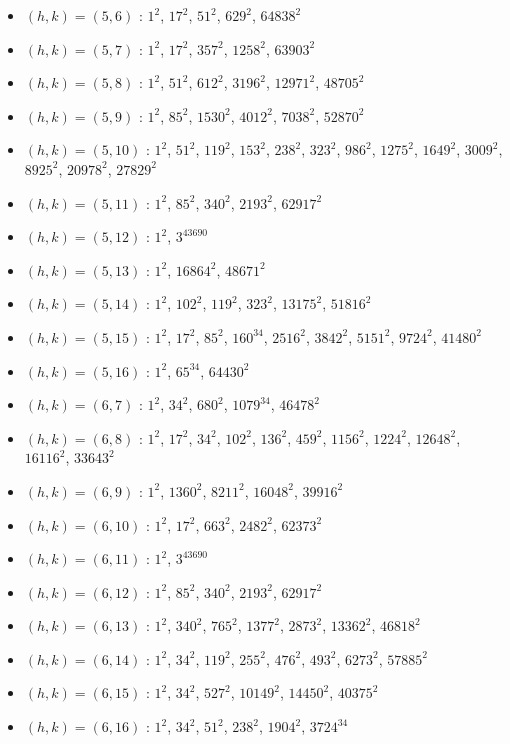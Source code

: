 \begin{itemize}
\item $(h,k)=(5,6)$ : $1^{2}$, $17^{2}$, $51^{2}$, $629^{2}$, $64838^{2}$
\item $(h,k)=(5,7)$ : $1^{2}$, $17^{2}$, $357^{2}$, $1258^{2}$, $63903^{2}$
\item $(h,k)=(5,8)$ : $1^{2}$, $51^{2}$, $612^{2}$, $3196^{2}$, $12971^{2}$, $48705^{2}$
\item $(h,k)=(5,9)$ : $1^{2}$, $85^{2}$, $1530^{2}$, $4012^{2}$, $7038^{2}$, $52870^{2}$
\item $(h,k)=(5,10)$ : $1^{2}$, $51^{2}$, $119^{2}$, $153^{2}$, $238^{2}$, $323^{2}$, $986^{2}$, $1275^{2}$, $1649^{2}$, $3009^{2}$, $8925^{2}$, $20978^{2}$, $27829^{2}$
\item $(h,k)=(5,11)$ : $1^{2}$, $85^{2}$, $340^{2}$, $2193^{2}$, $62917^{2}$
\item $(h,k)=(5,12)$ : $1^{2}$, $3^{43690}$
\item $(h,k)=(5,13)$ : $1^{2}$, $16864^{2}$, $48671^{2}$
\item $(h,k)=(5,14)$ : $1^{2}$, $102^{2}$, $119^{2}$, $323^{2}$, $13175^{2}$, $51816^{2}$
\item $(h,k)=(5,15)$ : $1^{2}$, $17^{2}$, $85^{2}$, $160^{34}$, $2516^{2}$, $3842^{2}$, $5151^{2}$, $9724^{2}$, $41480^{2}$
\item $(h,k)=(5,16)$ : $1^{2}$, $65^{34}$, $64430^{2}$
\item $(h,k)=(6,7)$ : $1^{2}$, $34^{2}$, $680^{2}$, $1079^{34}$, $46478^{2}$
\item $(h,k)=(6,8)$ : $1^{2}$, $17^{2}$, $34^{2}$, $102^{2}$, $136^{2}$, $459^{2}$, $1156^{2}$, $1224^{2}$, $12648^{2}$, $16116^{2}$, $33643^{2}$
\item $(h,k)=(6,9)$ : $1^{2}$, $1360^{2}$, $8211^{2}$, $16048^{2}$, $39916^{2}$
\item $(h,k)=(6,10)$ : $1^{2}$, $17^{2}$, $663^{2}$, $2482^{2}$, $62373^{2}$
\item $(h,k)=(6,11)$ : $1^{2}$, $3^{43690}$
\item $(h,k)=(6,12)$ : $1^{2}$, $85^{2}$, $340^{2}$, $2193^{2}$, $62917^{2}$
\item $(h,k)=(6,13)$ : $1^{2}$, $340^{2}$, $765^{2}$, $1377^{2}$, $2873^{2}$, $13362^{2}$, $46818^{2}$
\item $(h,k)=(6,14)$ : $1^{2}$, $34^{2}$, $119^{2}$, $255^{2}$, $476^{2}$, $493^{2}$, $6273^{2}$, $57885^{2}$
\item $(h,k)=(6,15)$ : $1^{2}$, $34^{2}$, $527^{2}$, $10149^{2}$, $14450^{2}$, $40375^{2}$
\item $(h,k)=(6,16)$ : $1^{2}$, $34^{2}$, $51^{2}$, $238^{2}$, $1904^{2}$, $3724^{34}$

\end{itemize}
